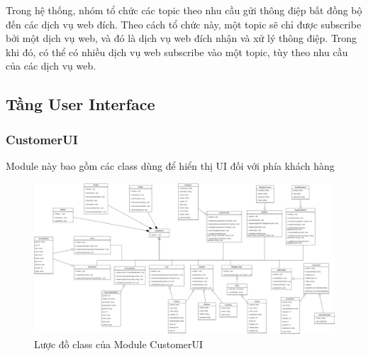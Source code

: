 \par Trong hệ thống, nhóm tổ chức các topic theo nhu cầu gửi thông điệp bất đồng bộ đến các dịch vụ web đích. Theo cách tổ chức này, một topic sẽ chỉ được subscribe bởi một dịch vụ web, và đó là dịch vụ web đích nhận và xử lý thông điệp. Trong khi đó, có thể có nhiều dịch vụ web subscribe vào một topic, tùy theo nhu cầu của các dịch vụ web.


\subsection{Tầng User Interface}
\subsubsection{CustomerUI}
Module này bao gồm các class dùng để hiển thị UI đối với phía khách hàng
\begin{figure}[!htp]
    \centering
    \includegraphics[width=17cm]{img/Architecture/UI/customer UI.png}
    \newline
    \caption{Lược đồ class của Module CustomerUI}
\end{figure}
 
